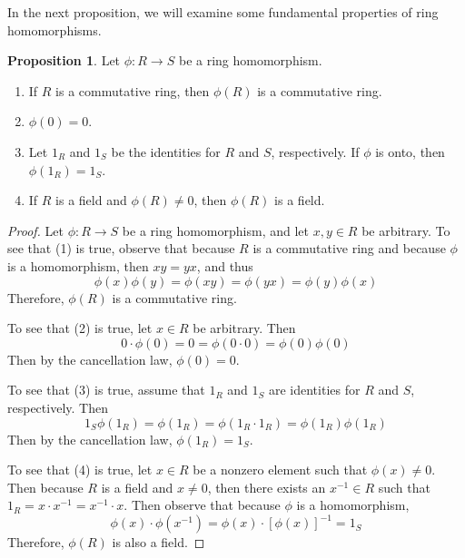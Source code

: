 \documentclass[11pt]{book}
\theoremstyle{definition}\newtheorem{definition}[subsection]{Definition}
\theoremstyle{definition}\newtheorem{example}[subsection]{Example}
\theoremstyle{definition}\newtheorem{notation}[subsection]{Notation}
\theoremstyle{definition}\newtheorem{remark}[subsection]{Remark}
\theoremstyle{theorem}\newtheorem{theorem}[subsection]{Theorem}
\theoremstyle{theorem}\newtheorem{lemma}[subsection]{Lemma}
\theoremstyle{theorem}\newtheorem{proposition}[subsection]{Proposition}
\theoremstyle{theorem}\newtheorem{corollary}[subsection]{Corollary}
\begin{document}
In the next proposition, we will examine some fundamental properties of ring homomorphisms.

\begin{proposition}\label{proposition:1.3.5}
    Let $\phi : R \to S$ be a ring homomorphism.
    \begin{enumerate}
        \item If $R$ is a commutative ring, then $\phi(R)$ is a commutative ring.
        \item $\phi(0) = 0$.
        \item Let $1_R$ and $1_S$ be the identities for $R$ and $S$, respectively. If $\phi$ is onto, then $\phi(1_R) = 1_S$.
        \item If $R$ is a field and $\phi(R) \neq 0$, then $\phi(R)$ is a field.
    \end{enumerate}
\end{proposition}

\begin{proof}
    Let $\phi : R \to S$ be a ring homomorphism, and let $x, y \in R$ be arbitrary. To see that (1) is true, observe that because $R$ is a commutative ring and because $\phi$ is a homomorphism, then $xy = yx$, and thus
    \begin{equation*}
        \phi(x)\phi(y) = \phi(xy) = \phi(yx) = \phi(y)\phi(x)
    \end{equation*}
    Therefore, $\phi(R)$ is a commutative ring.

    To see that (2) is true, let $x \in R$ be arbitrary. Then
    \begin{equation*}
        0 \cdot \phi(0) = 0 = \phi(0 \cdot 0) = \phi(0) \phi(0)
    \end{equation*}
    Then by the cancellation law, $\phi(0) = 0$.

    To see that (3) is true, assume that $1_R$ and $1_S$ are identities for $R$ and $S$, respectively. Then
    \begin{equation*}
        1_S\phi(1_R) = \phi(1_R) = \phi(1_R \cdot 1_R) = \phi(1_R)\phi(1_R)
    \end{equation*}
    Then by the cancellation law, $\phi(1_R) = 1_S$.

    To see that (4) is true, let $x \in R$ be a nonzero element such that $\phi(x) \neq 0$. Then because $R$ is a field and $x \neq 0$, then there exists an $x^{-1} \in R$ such that $1_R = x \cdot x^{-1} = x^{-1} \cdot x$. Then observe that because $\phi$ is a homomorphism,
    \begin{equation*}
        \phi(x) \cdot \phi(x^{-1}) = \phi(x) \cdot [\phi(x)]^{-1} = 1_S
    \end{equation*}
    Therefore, $\phi(R)$ is also a field.
\end{proof}
\end{document}
